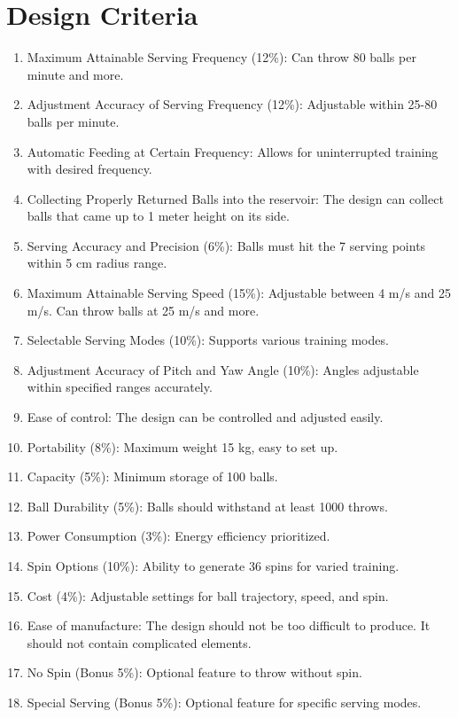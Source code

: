 \documentclass[12pt]{article}
\begin{document}
\quad 
\section{Design Criteria}
\begin{enumerate}
    \item Maximum Attainable Serving Frequency (12\%): Can throw 80 balls per minute and more.
    \item Adjustment Accuracy of Serving Frequency (12\%): Adjustable within 25-80 balls per minute.
    \item Automatic Feeding at Certain Frequency: Allows for uninterrupted training with desired frequency.
    \item Collecting Properly Returned Balls into the reservoir: The design can collect balls that came up to 1 meter height on its side.
    \item Serving Accuracy and Precision (6\%): Balls must hit the 7 serving points within 5 cm radius range.
    \item Maximum Attainable Serving Speed (15\%): Adjustable between 4 m/s and 25 m/s. Can throw balls at 25 m/s and more.
    \item Selectable Serving Modes (10\%): Supports various training modes.
    \item Adjustment Accuracy of Pitch and Yaw Angle (10\%): Angles adjustable within specified ranges accurately.
    \item Ease of control: The design can be controlled and adjusted easily.
    \item Portability (8\%): Maximum weight 15 kg, easy to set up.
    \item Capacity (5\%): Minimum storage of 100 balls.
    \item Ball Durability (5\%): Balls should withstand at least 1000 throws.
    \item Power Consumption (3\%): Energy efficiency prioritized.
    \item Spin Options (10\%): Ability to generate 36 spins for varied training.
    \item Cost (4\%): Adjustable settings for ball trajectory, speed, and spin.
    \item Ease of manufacture: The design should not be too difficult to produce. It should not contain complicated elements.
    \item No Spin (Bonus 5\%): Optional feature to throw without spin.
    \item Special Serving (Bonus 5\%): Optional feature for specific serving modes.
\end{enumerate}
\quad 


\end{document}
